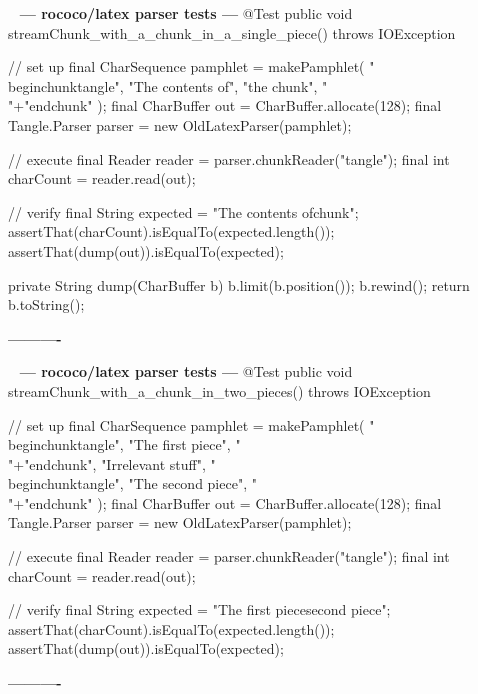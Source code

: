 \documentclass{book}
\newenvironment{chunk}[1]{%
{\ }\newline\noindent%
\hbox{\hskip 2.0cm}{\bf --- #1 ---}%
\verbatim}%                               say exactly what we see
{\endverbatim%
\par{}%
\noindent{}%
\hbox{\hskip 2.0cm}{\bf ----------}%
\par%
\normalsize\noindent}%
\begin{document}
\begin{chunk}{rococo/latex parser tests}
@Test
public void streamChunk_with_a_chunk_in_a_single_piece() throws IOException {
    // set up
    final CharSequence pamphlet = makePamphlet(
            "\\begin{chunk}{tangle}",
            "The contents of",
            "the chunk",
            "\\"+"end{chunk}"
    );
    final CharBuffer out = CharBuffer.allocate(128);
    final Tangle.Parser parser = new OldLatexParser(pamphlet);

    // execute
    final Reader reader = parser.chunkReader("tangle");
    final int charCount = reader.read(out);

    // verify
    final String expected = "The contents of\nthe chunk\n";
    assertThat(charCount).isEqualTo(expected.length());
    assertThat(dump(out)).isEqualTo(expected);
}

private String dump(CharBuffer b) {
    b.limit(b.position());
    b.rewind();
    return b.toString();
}
\end{chunk}

\begin{chunk}{rococo/latex parser tests}
@Test
public void streamChunk_with_a_chunk_in_two_pieces() throws IOException {
    // set up
    final CharSequence pamphlet = makePamphlet(
            "\\begin{chunk}{tangle}",
            "The first piece",
            "\\"+"end{chunk}",
            "Irrelevant stuff",
            "\\begin{chunk}{tangle}",
            "The second piece",
            "\\"+"end{chunk}"
    );
    final CharBuffer out = CharBuffer.allocate(128);
    final Tangle.Parser parser = new OldLatexParser(pamphlet);

    // execute
    final Reader reader = parser.chunkReader("tangle");
    final int charCount = reader.read(out);

    // verify
    final String expected = "The first piece\nThe second piece\n";
    assertThat(charCount).isEqualTo(expected.length());
    assertThat(dump(out)).isEqualTo(expected);
}
\end{chunk}
\end{document}
